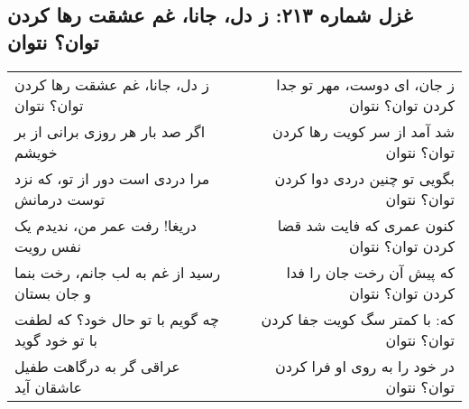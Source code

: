 \begin{center}
\section*{غزل شماره ۲۱۳: ز دل، جانا، غم عشقت رها کردن توان؟ نتوان}
\label{sec:213}
\begin{longtable}{l p{0.5cm} r}
ز دل، جانا، غم عشقت رها کردن توان؟ نتوان
&&
ز جان، ای دوست، مهر تو جدا کردن توان؟ نتوان
\\
اگر صد بار هر روزی برانی از بر خویشم
&&
شد آمد از سر کویت رها کردن توان؟ نتوان
\\
مرا دردی است دور از تو، که نزد توست درمانش
&&
بگویی تو چنین دردی دوا کردن توان؟ نتوان
\\
دریغا! رفت عمر من، ندیدم یک نفس رویت
&&
کنون عمری که فایت شد قضا کردن توان؟ نتوان
\\
رسید از غم به لب جانم، رخت بنما و جان بستان
&&
که پیش آن رخت جان را فدا کردن توان؟ نتوان
\\
چه گویم با تو حال خود؟ که لطفت با تو خود گوید
&&
که: با کمتر سگ کویت جفا کردن توان؟ نتوان
\\
عراقی گر به درگاهت طفیل عاشقان آید
&&
در خود را به روی او فرا کردن توان؟ نتوان
\\
\end{longtable}
\end{center}
